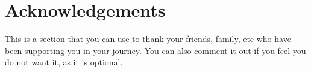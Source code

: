 \section*{Acknowledgements}

This is a section that you can use to thank your friends, family, etc who have been supporting you in your journey. You can also comment it out if you feel you do not want it, as it is optional. 
